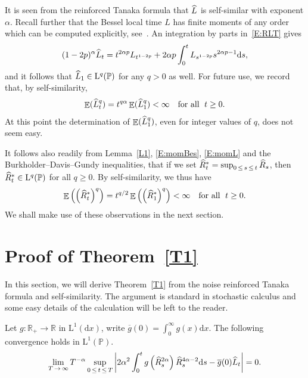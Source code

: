 \documentclass[AHL,Unicode,longabstracts,published]{cedram}
\renewcommand{\bar}[1]{\overline{#1}}
\renewcommand{\hat}[1]{\widehat{#1}}
\newcommand{\dd}{\mathrm{d}}
\newcommand{\rmL}{\mathrm{L}}
\DeclareMathOperator{\E}{\mathbb{E}}
\renewcommand{\P}{\mathbb{P}}
\newcommand{\R}{\mathbb{R}}
\let\oldhat\hat
\renewcommand*{\hat}[1]{\mathchoice{\widehat{#1}}{\widehat{#1}}{\oldhat{#1}}{\oldhat{#1}}}
\begin{document}
It is seen from the reinforced Tanaka formula that $\hat{L}$ is self-similar with exponent $\alpha$. Recall further that the Bessel local time ${L}$ has finite moments of any order which can be computed explicitly, see~\cite[Proposition~3.4]{DRVY}. An integration by parts in~\eqref{E:RLT} gives
\[
(1-2p)^{\alpha} \hat{L}_t= t^{2\alpha p} {L}_{t^{1-2p}} + 2\alpha p \int _0^{t} {L}_{s^{1-2p}} s^{2\alpha p-1} \dd s,
\]
and it follows that $\hat{L}_1\in {\rmL}^q(\P)$ for any $q>0$ as well. For future use, we record that, by self-similarity,
\begin{equation}\label{E:momL}
\E(\hat{L}_t^q) = t^{q \alpha} \E(\hat{L}_1^q)< \infty\quad \text{for all }\;t\geq 0.
\end{equation}
At this point the determination of $\E(\hat{L}_1^q)$, even for integer values of $q$, does not seem easy.


It follows also readily from Lemma~\ref{L1}, \eqref{E:momBes}, \eqref{E:momL} and the Burkholder--Davis--Gundy inequalities, that if we set $\hat R^*_t=\sup_{0\,\leq\,s\,\leq\,t} \hat R_s$, then $\hat R^*_t\in {\rmL}^q(\P)$ for all $q\geq 0$. By self-similarity, we thus have
\begin{equation}\label{E:momR}
\E\left(\left(\hat R^*_t\right)^q\right) = t^{q/2} \E\left(\left(\hat R^*_1\right)^q\right) < \infty \quad \text{for all }\;t\geq 0.
\end{equation}
We shall make use of these observations in the next section.

\section{Proof of Theorem~\ref{T1}}\label{sec:ProofThm1}
In this section, we will derive Theorem~\ref{T1} from the noise reinforced Tanaka formula and self-similarity. The argument is standard in stochastic calculus and some easy details of the calculation will be left to the reader.

\begin{lemm}\label{L2}
Let $g: \R_+\to \R$ in $\rmL^1(\dd x)$, write $\bar g(0)=\int_0^{\infty}g(x)\dd x$. The following convergence holds in $\rmL^1(\P)$.
\[
\lim_{T\,\to\,\infty} T^{-\alpha} \sup_{0\,\leq\,t\,\leq\,T} \left| 2\alpha^2 \int_0^{t} g\left(\hat R^{2\alpha}_s\right)\hat R_s^{4\alpha-2} \dd s - \bar g(0) \hat{L}_t \right| = 0.
\]
\end{lemm}
\end{document}
